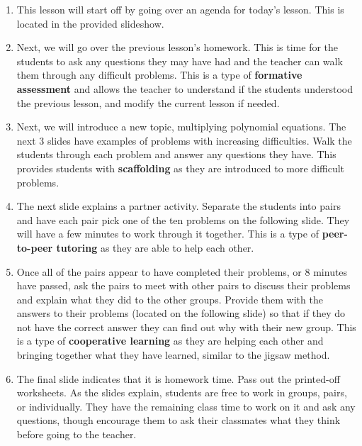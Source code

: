 \begin{enumerate}
    \item This lesson will start off by going over an agenda for today's lesson. This is located in the provided slideshow.
    \item Next, we will go over the previous lesson's homework. This is time for the students to ask any questions they may have had and the teacher can walk them through any difficult problems. This is a type of \textbf{formative assessment} and allows the teacher to understand if the students understood the previous lesson, and modify the current lesson if needed.
    \item Next, we will introduce a new topic, multiplying polynomial equations. The next 3 slides have examples of problems with increasing difficulties. Walk the students through each problem and answer any questions they have. This provides students with \textbf{scaffolding} as they are introduced to more difficult problems.
    \item The next slide explains a partner activity. Separate the students into pairs and have each pair pick one of the ten problems on the following slide. They will have a few minutes to work through it together. This is a type of \textbf{peer-to-peer tutoring} as they are able to help each other.
    \item Once all of the pairs appear to have completed their problems, or 8 minutes have passed, ask the pairs to meet with other pairs to discuss their problems and explain what they did to the other groups. Provide them with the answers to their problems (located on the following slide) so that if they do not have the correct answer they can find out why with their new group. This is a type of \textbf{cooperative learning} as they are helping each other and bringing together what they have learned, similar to the jigsaw method.
    \item The final slide indicates that it is homework time. Pass out the printed-off worksheets. As the slides explain, students are free to work in groups, pairs, or individually. They have the remaining class time to work on it and ask any questions, though encourage them to ask their classmates what they think before going to the teacher.
\end{enumerate}
